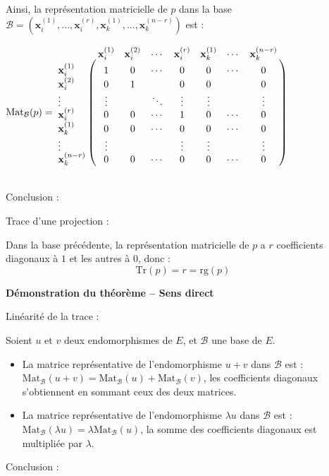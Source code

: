 \documentclass[10pt,a4paper]{article}
\begin{document}
Ainsi, la représentation matricielle de $p$ dans la base $\mathcal{B} = (\mathbf{x}_i^{(1)}, ..., \mathbf{x}_i^{(r)}, \mathbf{x}_k^{(1)}, ..., \mathbf{x}_k^{(n-r)})$ est :\\
\centerline{$\mathrm{Mat}_{\mathcal{B}}(p) = \bordermatrix{
& \mathbf{x}_i^{(1)} & \mathbf{x}_i^{(2)} & \cdots & \mathbf{x}_i^{(r)} & \mathbf{x}_k^{(1)} & \cdots & \mathbf{x}_k^{(n-r)} \cr
\mathbf{x}_i^{(1)} & 1 & 0 & \cdots & 0 & 0 & \cdots & 0 \cr
\mathbf{x}_i^{(2)} & 0 & 1 &  & 0 & 0 &  & 0 \cr
\vdots & \vdots &  & \ddots & \vdots & \vdots &  & \vdots \cr
\mathbf{x}_i^{(r)} & 0 & 0 & \cdots & 1 & 0 & \cdots & 0 \cr
\mathbf{x}_k^{(1)} & 0 & 0 & \cdots & 0 & 0 & \cdots & 0 \cr
\vdots & \vdots &  &  & \vdots & \vdots &  & \vdots \cr
\mathbf{x}_k^{(n-r)} & 0 & 0 & \cdots & 0 & 0 & \cdots & 0 \cr}$}\\

Conclusion : 

\q Trace d'une projection :

Dans la base précédente, la représentation matricielle de $p$ a $r$ coefficients diagonaux à $1$ et les autres à $0$, donc :
\[
\mathrm{Tr}(p) = r = \mathrm{rg}(p)
\]

\bigskip
\textbf{Démonstration du théorème -- Sens direct}

\q Linéarité de la trace :

Soient $u$ et $v$ deux endomorphismes de $E$, et $\mathcal{B}$ une base de $E$.
\begin{itemize}
 \item La matrice représentative de l'endomorphisme $u + v$ dans $\mathcal{B}$ est : $\mathrm{Mat}_{\mathcal{B}}(u + v)
= \mathrm{Mat}_{\mathcal{B}}(u)
+ \mathrm{Mat}_{\mathcal{B}}(v)$, les coefficients diagonaux s'obtiennent en sommant ceux des deux matrices.
\item La matrice représentative de l'endomorphisme $\lambda u $ dans $\mathcal{B}$ est : $\mathrm{Mat}_{\mathcal{B}}(\lambda u)
= \lambda\mathrm{Mat}_{\mathcal{B}}(u)$, la somme des coefficients diagonaux est multipliée par $\lambda$.
\end{itemize}
Conclusion : 
\end{document}
